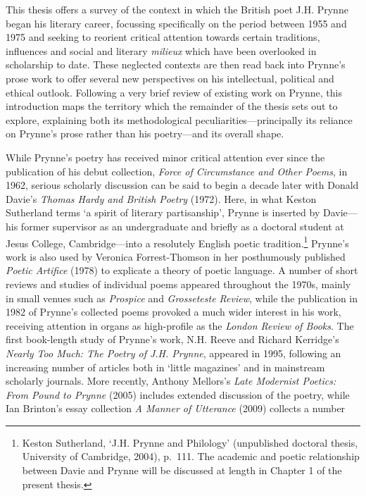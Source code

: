\documentclass[]{article}
\begin{document}
\noindent This thesis offers a survey of the context in which the
British poet J.H. Prynne began his literary career, focussing
specifically on the period between 1955 and 1975 and seeking to reorient
critical attention towards certain traditions, influences and social and
literary \emph{milieux} which have been overlooked in scholarship to
date. These neglected contexts are then read back into Prynne's prose
work to offer several new perspectives on his intellectual, political
and ethical outlook. Following a very brief review of existing work on
Prynne, this introduction maps the territory which the remainder of the
thesis sets out to explore, explaining both its methodological
peculiarities---principally its reliance on Prynne's prose rather than
his poetry---and its overall shape.

While Prynne's poetry has received minor critical attention ever since
the publication of his debut collection, \emph{Force of Circumstance and
Other Poems}, in 1962, serious scholarly discussion can be said to begin
a decade later with Donald Davie's \emph{Thomas Hardy and British
Poetry} (1972). Here, in what Keston Sutherland terms `a spirit of
literary partisanship', Prynne is inserted by Davie---his former
supervisor as an undergraduate and briefly as a doctoral student at
Jesus College, Cambridge---into a resolutely English poetic
tradition.\footnote{Keston Sutherland, `J.H. Prynne and Philology'
  (unpublished doctoral thesis, University of Cambridge, 2004), p.~111.
  The academic and poetic relationship between Davie and Prynne will be
  discussed at length in Chapter 1 of the present thesis.} Prynne's work
is also used by Veronica Forrest-Thomson in her posthumously published
\emph{Poetic Artifice} (1978) to explicate a theory of poetic language.
A number of short reviews and studies of individual poems appeared
throughout the 1970s, mainly in small venues such as \emph{Prospice} and
\emph{Grosseteste Review}, while the publication in 1982 of Prynne's
collected poems provoked a much wider interest in his work, receiving
attention in organs as high-profile as the \emph{London Review of
Books}. The first book-length study of Prynne's work, N.H. Reeve and
Richard Kerridge's \emph{Nearly Too Much: The Poetry of J.H. Prynne},
appeared in 1995, following an increasing number of articles both in
`little magazines' and in mainstream scholarly journals. More recently,
Anthony Mellors's \emph{Late Modernist Poetics: From Pound to Prynne}
(2005) includes extended discussion of the poetry, while Ian Brinton's
essay collection \emph{A Manner of Utterance} (2009) collects a number
\end{document}

